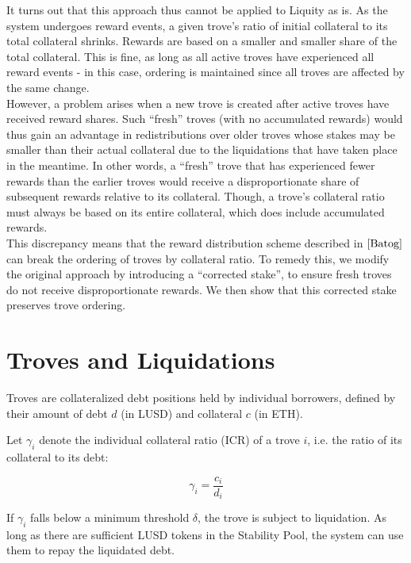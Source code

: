 \documentclass[reqno]{article}
\begin{document}
It turns out that this approach thus cannot be applied to Liquity as is. As the system undergoes reward events, a given trove’s ratio of initial collateral to its total collateral shrinks. Rewards are based on a smaller and smaller share of the total collateral. This is fine, as long as all active troves have experienced all reward events - in this case, ordering is maintained since all troves are affected by the same change. \\

However, a problem arises when a new trove is created after active troves have received reward shares.  Such “fresh” troves (with no accumulated rewards) would thus gain an advantage in redistributions over older troves whose stakes may be smaller than their actual collateral due to the liquidations that have taken place in the meantime. In other words, a “fresh” trove that has experienced fewer rewards than the earlier troves would receive a disproportionate share of subsequent rewards relative to its collateral. Though, a trove's collateral ratio must always be based on its entire collateral, which does include accumulated rewards.  \\

This discrepancy means that the reward distribution scheme described in $\cite{Batog}$ can break the ordering of troves by collateral ratio. To remedy this, we modify the original approach by introducing a “corrected stake”, to ensure fresh troves do not receive disproportionate rewards. We then show that this corrected stake preserves trove ordering. \\


\section{Troves and Liquidations}
Troves are collateralized debt positions held by individual borrowers, defined by their amount of debt $d$ (in LUSD) and collateral $c$ (in ETH).

Let $\gamma_i$ denote the individual collateral ratio (ICR) of a trove $i$, i.e. the ratio of its collateral to its debt:

\begin{equation}
    \gamma_i = \frac{c_i} {d_i}
\end{equation}

If $\gamma_i$ falls below a minimum threshold $\delta$, the trove is subject to liquidation. As long as there are sufficient LUSD tokens in the Stability Pool, the system can use them to repay the liquidated debt. 
\end{document}
